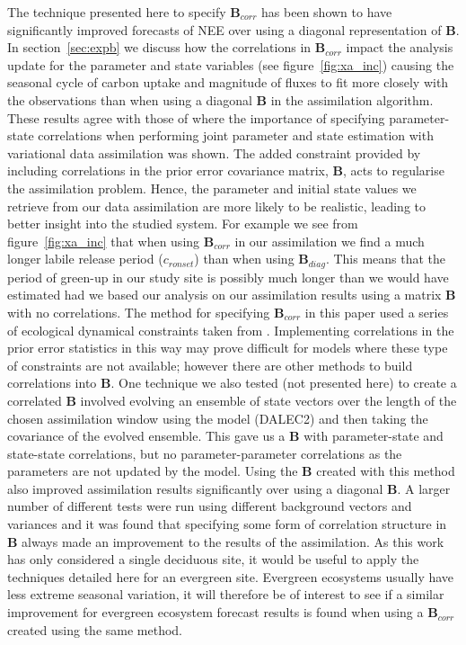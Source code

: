 \documentclass[review]{elsarticle}
\begin{document}
The technique presented here to specify ${\mathbf{B}}_{corr}$ has been shown to have significantly improved forecasts of NEE over using a diagonal representation of ${\mathbf{B}}$. In section~\ref{sec:expb} we discuss how the correlations in ${\mathbf{B}}_{corr}$ impact the analysis update for the parameter and state variables (see figure~\ref{fig:xa_inc}) causing the seasonal cycle of carbon uptake and magnitude of fluxes to fit more closely with the observations than when using a diagonal ${\mathbf{B}}$ in the assimilation algorithm. These results agree with those of \citet{smith2009variational} where the importance of specifying parameter-state correlations when performing joint parameter and state estimation with variational data assimilation was shown. The added constraint provided by including correlations in the prior error covariance matrix, $\textbf{B}$, acts to regularise the assimilation problem. Hence, the parameter and initial state values we retrieve from our data assimilation are more likely to be realistic, leading to better insight into the studied system. For example we see from figure~\ref{fig:xa_inc} that when using ${\mathbf{B}}_{corr}$ in our assimilation we find a much longer labile release period ($c_{ronset}$) than when using ${\mathbf{B}}_{diag}$. This means that the period of green-up in our study site is possibly much longer than we would have estimated had we based our analysis on our assimilation results using a matrix ${\mathbf{B}}$ with no correlations. The method for specifying ${\mathbf{B}}_{corr}$ in this paper used a series of ecological dynamical constraints taken from \citet{Bloom2015}. Implementing correlations in the prior error statistics in this way may prove difficult for models where these type of constraints are not available; however there are other methods to build correlations into $\textbf{B}$. One technique we also tested (not presented here) to create a correlated $\textbf{B}$ involved evolving an ensemble of state vectors over the length of the chosen assimilation window using the model (DALEC2) and then taking the covariance of the evolved ensemble. This gave us a \textbf{B} with parameter-state and state-state correlations, but no parameter-parameter correlations as the parameters are not updated by the model. Using the $\textbf{B}$ created with this method also improved assimilation results significantly over using a diagonal $\textbf{B}$. A larger number of different tests were run using different background vectors and variances and it was found that specifying some form of correlation structure in $\textbf{B}$ always made an improvement to the results of the assimilation. As this work has only considered a single deciduous site, it would be useful to apply the techniques detailed here for an evergreen site. Evergreen ecosystems usually have less extreme seasonal variation, it will therefore be of interest to see if a similar improvement for evergreen ecosystem forecast results is found when using a ${\mathbf{B}}_{corr}$ created using the same method.
\end{document}
